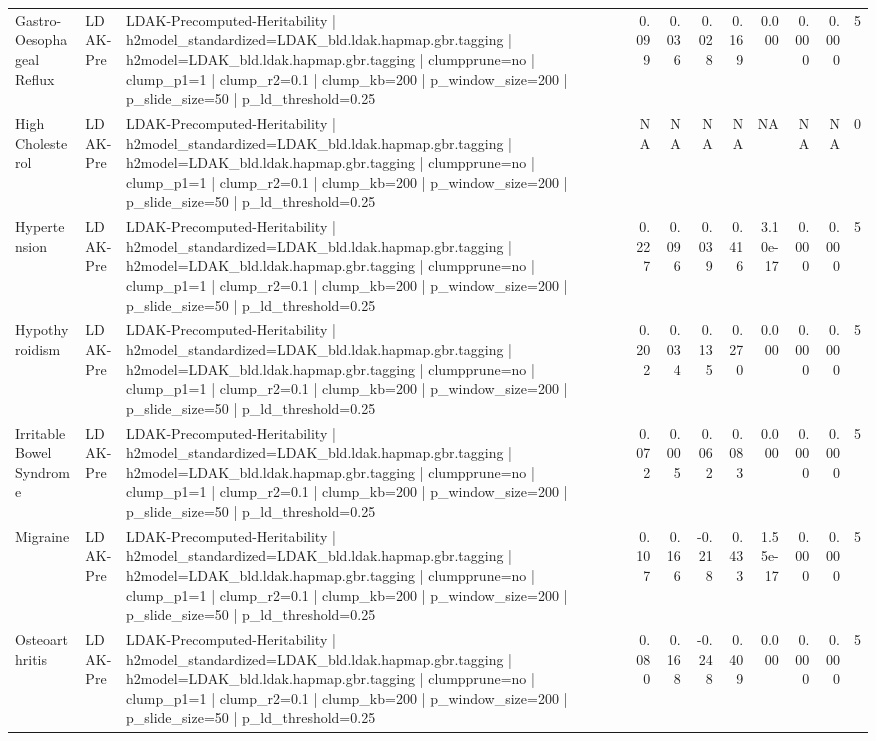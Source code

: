 \begin{landscape}
\begin{longtable}{p{2.4cm}p{1.8cm}p{6.0cm}rrrrrrrr}
Gastro-Oesophageal Reflux & LDAK-Pre & LDAK-Precomputed-Heritability | h2model\_standardized=LDAK\_bld.ldak.hapmap.gbr.tagging | h2model=LDAK\_bld.ldak.hapmap.gbr.tagging | clumpprune=no | clump\_p1=1 | clump\_r2=0.1 | clump\_kb=200 | p\_window\_size=200 | p\_slide\_size=50 | p\_ld\_threshold=0.25 & 0.099 & 0.036 & 0.028 & 0.169 & 0.000 & 0.000 & 0.000 & 5 \\
High Cholesterol & LDAK-Pre & LDAK-Precomputed-Heritability | h2model\_standardized=LDAK\_bld.ldak.hapmap.gbr.tagging | h2model=LDAK\_bld.ldak.hapmap.gbr.tagging | clumpprune=no | clump\_p1=1 | clump\_r2=0.1 | clump\_kb=200 | p\_window\_size=200 | p\_slide\_size=50 | p\_ld\_threshold=0.25 & NA & NA & NA & NA & NA & NA & NA & 0 \\
Hypertension & LDAK-Pre & LDAK-Precomputed-Heritability | h2model\_standardized=LDAK\_bld.ldak.hapmap.gbr.tagging | h2model=LDAK\_bld.ldak.hapmap.gbr.tagging | clumpprune=no | clump\_p1=1 | clump\_r2=0.1 | clump\_kb=200 | p\_window\_size=200 | p\_slide\_size=50 | p\_ld\_threshold=0.25 & 0.227 & 0.096 & 0.039 & 0.416 & 3.10e-17 & 0.000 & 0.000 & 5 \\
Hypothyroidism & LDAK-Pre & LDAK-Precomputed-Heritability | h2model\_standardized=LDAK\_bld.ldak.hapmap.gbr.tagging | h2model=LDAK\_bld.ldak.hapmap.gbr.tagging | clumpprune=no | clump\_p1=1 | clump\_r2=0.1 | clump\_kb=200 | p\_window\_size=200 | p\_slide\_size=50 | p\_ld\_threshold=0.25 & 0.202 & 0.034 & 0.135 & 0.270 & 0.000 & 0.000 & 0.000 & 5 \\
Irritable Bowel Syndrome & LDAK-Pre & LDAK-Precomputed-Heritability | h2model\_standardized=LDAK\_bld.ldak.hapmap.gbr.tagging | h2model=LDAK\_bld.ldak.hapmap.gbr.tagging | clumpprune=no | clump\_p1=1 | clump\_r2=0.1 | clump\_kb=200 | p\_window\_size=200 | p\_slide\_size=50 | p\_ld\_threshold=0.25 & 0.072 & 0.005 & 0.062 & 0.083 & 0.000 & 0.000 & 0.000 & 5 \\
Migraine & LDAK-Pre & LDAK-Precomputed-Heritability | h2model\_standardized=LDAK\_bld.ldak.hapmap.gbr.tagging | h2model=LDAK\_bld.ldak.hapmap.gbr.tagging | clumpprune=no | clump\_p1=1 | clump\_r2=0.1 | clump\_kb=200 | p\_window\_size=200 | p\_slide\_size=50 | p\_ld\_threshold=0.25 & 0.107 & 0.166 & -0.218 & 0.433 & 1.55e-17 & 0.000 & 0.000 & 5 \\
Osteoarthritis & LDAK-Pre & LDAK-Precomputed-Heritability | h2model\_standardized=LDAK\_bld.ldak.hapmap.gbr.tagging | h2model=LDAK\_bld.ldak.hapmap.gbr.tagging | clumpprune=no | clump\_p1=1 | clump\_r2=0.1 | clump\_kb=200 | p\_window\_size=200 | p\_slide\_size=50 | p\_ld\_threshold=0.25 & 0.080 & 0.168 & -0.248 & 0.409 & 0.000 & 0.000 & 0.000 & 5 \\

\end{longtable}
\end{landscape}
